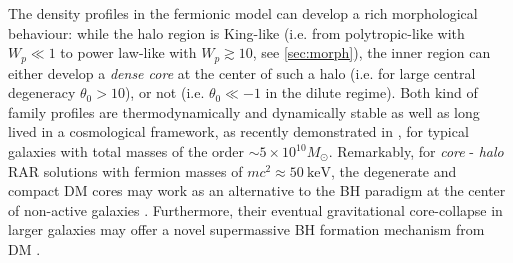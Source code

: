 The density profiles in the fermionic model can develop a rich morphological behaviour: while the halo region is King-like (i.e. from polytropic-like with $W_p \ll 1$ to power law-like with $W_p \gtrsim 10$, see \ref{sec:morph}), the inner region can either develop a \textit{dense core} at the center of such a halo (i.e. for large central degeneracy $\theta_0 > 10$), or not (i.e. $\theta_0 \ll -1$ in the dilute regime). Both kind of family profiles are thermodynamically and dynamically stable as well as long lived in a cosmological framework, as recently demonstrated in \citet{2021MNRAS.502.4227A}, for typical galaxies with total masses of the order $\sim 5\times 10^{10} M_\odot$. Remarkably, for \textit{core} - \textit{halo} RAR solutions with fermion masses of $m c^2\approx \SI{50}{\kilo\eV}$, the degenerate and compact DM cores may work as an alternative to the BH paradigm at the center of non-active galaxies \citep{2018PDU....21...82A,2019PDU....24..278A,2020A&A...641A..34B,2021MNRAS.505L..64B,2022MNRAS.511L..35A}. Furthermore, their eventual gravitational core-collapse in larger galaxies may offer a novel supermassive BH formation mechanism from DM \citep{2021MNRAS.502.4227A}.
